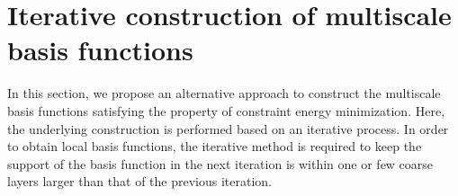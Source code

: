 \documentclass{article}[11pt]
\theoremstyle{definition}
\begin{document}

\section{Iterative construction of multiscale basis functions}\label{sec:iterative}

In this section, we propose an alternative approach to construct the multiscale basis functions satisfying the property of constraint energy minimization. 
Here, the underlying construction is performed based on an iterative process. 
In order to obtain local basis functions, the iterative method is required to keep the support of the basis function in the next iteration is within one or few coarse layers larger than that of the previous iteration. 
\end{document}
